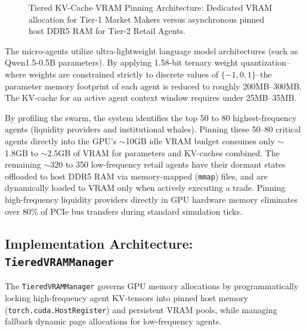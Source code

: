\begin{figure}[htbp]
\caption{Tiered KV-Cache VRAM Pinning Architecture: Dedicated VRAM allocation for Tier-1 Market Makers versus asynchronous pinned host DDR5 RAM for Tier-2 Retail Agents.}
\label{fig:tiered_vram}
\end{figure}

The micro-agents utilize ultra-lightweight language model architectures (such as Qwen1.5-0.5B parameters). By applying 1.58-bit ternary weight quantization--where weights are constrained strictly to discrete values of $\{-1, 0, 1\}$--the parameter memory footprint of each agent is reduced to roughly 200MB--300MB. The KV-cache for an active agent context window requires under 25MB--35MB.

By profiling the swarm, the system identifies the top 50 to 80 highest-frequency agents (liquidity providers and institutional whales). Pinning these 50--80 critical agents directly into the GPU's $\sim$10GB idle VRAM budget consumes only $\sim$1.8GB to $\sim$2.5GB of VRAM for parameters and KV-caches combined. The remaining $\sim$320 to 350 low-frequency retail agents have their dormant states offloaded to host DDR5 RAM via memory-mapped (\texttt{mmap}) files, and are dynamically loaded to VRAM only when actively executing a trade. Pinning high-frequency liquidity providers directly in GPU hardware memory eliminates over 80\% of PCIe bus transfers during standard simulation ticks.

\subsection{Implementation Architecture: \texttt{TieredVRAMManager}}

The \texttt{TieredVRAMManager} governs GPU memory allocations by programmatically locking high-frequency agent KV-tensors into pinned host memory (\texttt{torch.cuda.HostRegister}) and persistent VRAM pools, while managing fallback dynamic page allocations for low-frequency agents.

